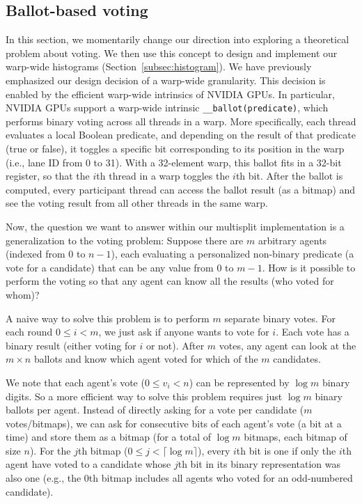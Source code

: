 \subsection{Ballot-based voting}\label{subsec:ballot}
In this section, we momentarily change our direction into exploring a theoretical problem about voting.
We then use this concept to design and implement our warp-wide histograms (Section~\ref{subsec:histogram}).
We have previously emphasized our design decision of a warp-wide granularity. This decision is enabled by the efficient warp-wide intrinsics of NVIDIA GPUs.
In particular, NVIDIA GPUs support a warp-wide intrinsic \texttt{\_\_ballot(predicate)}, which performs binary voting across all threads in a warp. More specifically, each thread evaluates a local Boolean predicate, and depending on the result of that predicate (true or false), it toggles a specific bit corresponding to its position in the warp (i.e., lane ID from 0 to 31).
With a 32-element warp, this ballot fits in a 32-bit register, so that the $i$th thread in a warp toggles the $i$th bit.
After the ballot is computed, every participant thread can access the ballot result (as a bitmap) and see the voting result from all other threads in the same warp.

Now, the question we want to answer within our multisplit implementation is a generalization to the voting problem: Suppose there are $m$ arbitrary agents (indexed from $0$ to $n-1$), each evaluating a personalized non-binary predicate (a vote for a candidate) that can be any value from $0$ to $m-1$. 
How is it possible to perform the voting so that any agent can know all the results (who voted for whom)?

A naive way to solve this problem is to perform $m$ separate binary votes. For each round $0 \leq i < m$, we just ask if anyone wants to vote for $i$. Each vote has a binary result (either voting for $i$ or not). After $m$ votes, any agent can look at the $m\times n$ ballots and know which agent voted for which of the $m$ candidates. 

We note that each agent's vote ($0 \leq v_i < n$) can be represented by $\log m$ binary digits. So a more efficient way to solve this problem requires just $\log m$ binary ballots per agent. Instead of directly asking for a vote per candidate ($m$ votes/bitmaps), we can ask for consecutive bits of each agent's vote (a bit at a time) and store them as a bitmap (for a total of $\log m$ bitmaps, each bitmap of size $n$).
For the $j$th bitmap ($0 \leq j < \lceil\log m\rceil$), every $i$th bit is one if only the $i$th agent have voted to a candidate whose $j$th bit in its binary representation was also one (e.g., the 0th bitmap includes all agents who voted for an odd-numbered candidate).  

